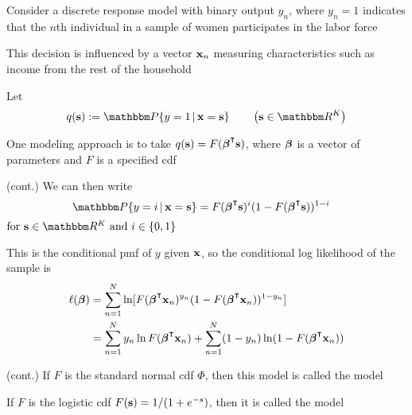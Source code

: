 \begin{frame}

    \vspace{2em}
    \Eg
    Consider a discrete response model with binary output $y_n$, where $y_n=1$
    indicates that the $n$th individual in a sample of women participates in
    the labor force
    
    This decision is influenced by a vector ${\mathbf x}_n$
    measuring characteristics such as income from the rest of the household
    
    \vspace{2em}
    Let 
    \begin{equation*}
        q(\bolds) 
        := \PP\{ y = 1 \given \boldx = \bolds \}
        \qquad \left(\bolds \in \RR^K \right)
    \end{equation*}
    
    One modeling approach is to take $q(\bolds) = F(\boldbeta^\T \bolds)$,
    where ${\boldsymbol \beta}$ is a vector of parameters and $F$ is a specified {\sc cdf}
    
\end{frame}

\begin{frame}

    \vspace{2em}
    \Eg (cont.)
    We can then write
    \begin{equation*}
        \PP\{ y = i \given \boldx = \bolds\} 
        = F(\boldbeta^\T \bolds)^i 
            (1 - F(\boldbeta^\T \bolds))^{1-i}
        \quad 
    \end{equation*}
    $\text{for } \bolds \in \RR^K \text{ and } i \in \{0, 1\}$

    This is the conditional {\sc pmf} of $y$ given ${\mathbf x}$, so
    the conditional log likelihood of the sample is
    \begin{align*}
        \ell(\boldbeta) 
        & = \sum_{n=1}^N \ln 
            [ F(\boldbeta^\T \boldx_n)^{y_n} (1 - F(\boldbeta^\T \boldx_n))^{1-y_n} ]
        \\
        & = \sum_{n=1}^N 
            y_n \ln F(\boldbeta^\T \boldx_n) + \sum_{n=1}^N (1 - y_n) \ln (1 -
            F(\boldbeta^\T \boldx_n))
    \end{align*}

\end{frame}

\begin{frame}

    \vspace{2em}
    \Eg (cont.)
    If $F$ is the standard normal {\sc cdf} $\Phi$, then this model is called
    the  model
    
    \vspace{.7em}
    If $F$ is the logistic {\sc cdf} $F({\mathbf s}) =
    1/(1 + e^{-s})$, then it is called the  model

\end{frame}


